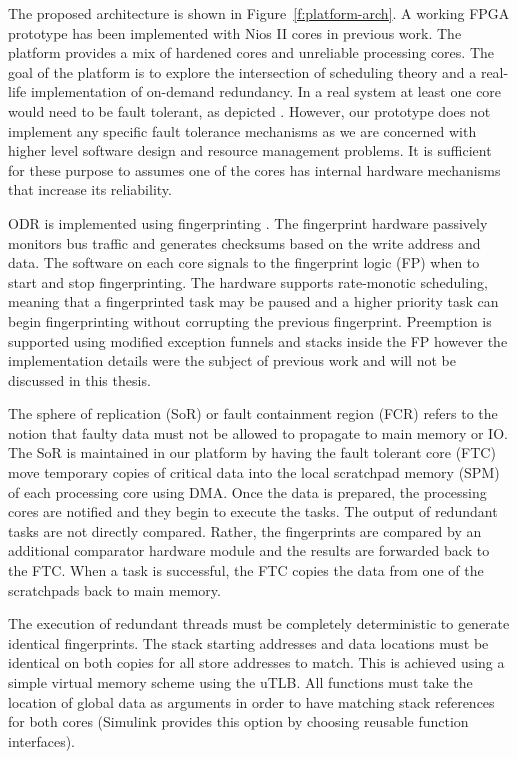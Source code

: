 	The proposed architecture is shown in Figure~\ref{f:platform-arch}. 
	A working FPGA prototype has been implemented with Nios II cores in previous work. 
	The platform provides a mix of hardened cores and unreliable processing cores. 
	The goal of the platform is to explore the intersection of scheduling theory and a real-life implementation of on-demand redundancy. 
	In a real system at least one core would need to be fault tolerant, as depicted \cite{dobel2012watches}. 
	However, our prototype does not implement any specific fault tolerance mechanisms as we are concerned with higher level software design and resource management problems. 
	It is sufficient for these purpose to assumes one of the cores has internal hardware mechanisms that increase its reliability.

	ODR is implemented using fingerprinting \cite{Smolens:04}. 
	The fingerprint hardware passively monitors bus traffic and generates checksums based on the write address and data.
	The software on each core signals to the fingerprint logic (FP) when to start and stop fingerprinting.
	The hardware supports rate-monotic scheduling, meaning that a fingerprinted task may be paused and a higher priority task can begin fingerprinting without corrupting the previous fingerprint.
	Preemption is supported using modified exception funnels and stacks inside the FP however the implementation details were the subject of previous work and will not be discussed in this thesis.
	
	The sphere of replication (SoR) or fault containment region (FCR) refers to the notion that faulty data must not be allowed to propagate to main memory or IO. 
	The SoR is maintained in our platform by having the fault tolerant core (FTC) move temporary copies of critical data into the local scratchpad memory (SPM) of each processing core using DMA. 
	Once the data is prepared, the processing cores are notified and they begin to execute the tasks. 
	The output of redundant tasks are not directly compared.
	Rather, the fingerprints are compared by an additional comparator hardware module and the results are forwarded back to the FTC. 
	When a task is successful, the FTC copies the data from one of the scratchpads back to main memory.
	
	The execution of redundant threads must be completely deterministic to generate identical fingerprints. 
	The stack starting addresses and data locations must be identical on both copies for all store addresses to match.
	This is achieved using a simple virtual memory scheme using the uTLB.
	All functions must take the location of global data as arguments in order to have matching stack references for both cores (Simulink provides this option by choosing reusable function interfaces).

